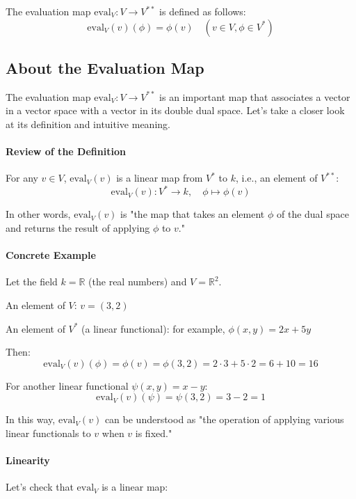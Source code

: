 \documentclass[uplatex,a4j,12pt,dvipdfmx]{jsarticle}
\begin{document}
The evaluation map $\mathrm{eval}_V: V \to V^{**}$ is defined as follows:
\[
	\mathrm{eval}_V(v)(\phi) = \phi(v) \quad (v \in V, \phi \in V^*)
\]





\subsection{About the Evaluation Map}

The evaluation map $\mathrm{eval}_V: V \to V^{**}$ is an important map that associates a vector in a vector space with a vector in its double dual space. Let's take a closer look at its definition and intuitive meaning.

\paragraph{Review of the Definition}
For any $v \in V$, $\mathrm{eval}_V(v)$ is a linear map from $V^*$ to $k$, i.e., an element of $V^{**}$:
\[
	\mathrm{eval}_V(v): V^* \to k, \quad \phi \mapsto \phi(v)
\]

In other words, $\mathrm{eval}_V(v)$ is "the map that takes an element $\phi$ of the dual space and returns the result of applying $\phi$ to $v$."

\paragraph{Concrete Example}

Let the field $k = \mathbb{R}$ (the real numbers) and $V = \mathbb{R}^2$.

An element of $V$: $v = (3, 2)$

An element of $V^*$ (a linear functional): for example, $\phi(x,y) = 2x + 5y$

Then:
\[
	\mathrm{eval}_V(v)(\phi) = \phi(v) = \phi(3,2) = 2\cdot3 + 5\cdot2 = 6 + 10 = 16
\]

For another linear functional $\psi(x,y) = x - y$:
\[
	\mathrm{eval}_V(v)(\psi) = \psi(3,2) = 3 - 2 = 1
\]

In this way, $\mathrm{eval}_V(v)$ can be understood as "the operation of applying various linear functionals to $v$ when $v$ is fixed."

\paragraph{Linearity}

Let's check that $\mathrm{eval}_V$ is a linear map:
\end{document}

